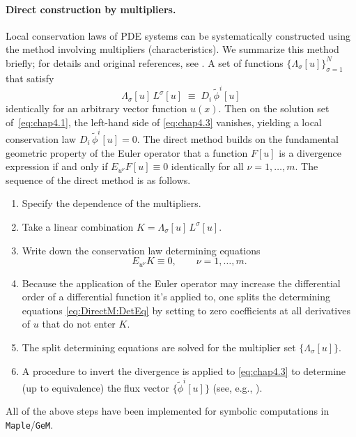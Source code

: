 \documentclass[alpha-refs, 12pt]{wiley-article}
\begin{document}
\paragraph{Direct construction by multipliers.} Local conservation laws of PDE systems can be systematically constructed using the method involving multipliers (characteristics). We summarize this method briefly; for details and original references, see  \cite{Bluman2010}. A set of functions
$\{\Lambda_{\sigma}[u]\}_{\sigma=1}^{N}$ that satisfy
\begin{equation}\label{eq:chap4.3}
  \Lambda_{\sigma}[u]\,L^{\sigma}[u]
  \;\equiv\;
  D_{i}\,\tilde{\phi}^{i}[u]
\end{equation}
identically for an arbitrary vector function $u(x)$. Then on the solution set of~\eqref{eq:chap4.1}, the left-hand side of \eqref{eq:chap4.3} vanishes, yielding a local conservation law $D_{i}\,\tilde{\phi}^{i}[u]=0$. The direct method builds on the fundamental geometric property of the Euler operator that a function $F[u]$ is a divergence expression if and only if $E_{u^\nu}F[u]\equiv 0$ identically for all $\nu=1,\dots,m$. The sequence of the direct method is as follows.

\begin{enumerate}
  \item Specify the dependence of the multipliers.
  \item Take a linear combination $K = \Lambda_{\sigma}[u]\,L^{\sigma}[u]$.
  \item Write down the conservation law determining equations
\begin{equation}\label{eq:DirectM:DetEq}
  E_{u^\nu} K \equiv 0,\qquad \nu=1,\dots,m.
\end{equation}
  \item Because the application of the Euler operator may increase the differential order of a differential function it's applied to, one splits the determining equations \eqref{eq:DirectM:DetEq} by setting to zero coefficients at all derivatives of $u$ that do not enter $K$.
  \item The split determining equations are solved for the multiplier set  $\{\Lambda_{\sigma}[u]\}$.
  \item A procedure to invert the divergence is applied to \eqref{eq:chap4.3} to determine (up to equivalence) the flux vector $\{\tilde{\phi}^{i}[u]\}$ (see, e.g., \citet{cheviakov2010computation}).
\end{enumerate}

All of the above steps have been implemented for symbolic computations in \texttt{Maple}/\texttt{GeM}.
\end{document}
